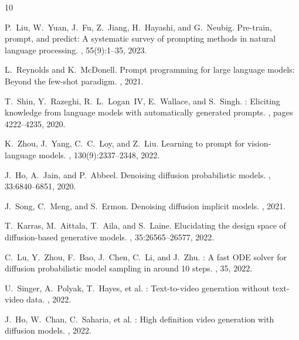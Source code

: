\documentclass[10pt,twocolumn,letterpaper]{article}
\begin{document}
{\begin{thebibliography}{10}

P.~Liu, W.~Yuan, J.~Fu, Z.~Jiang, H.~Hayashi, and G.~Neubig.
\newblock Pre-train, prompt, and predict: A systematic survey of prompting methods in natural language processing.
, 55(9):1--35, 2023.

L.~Reynolds and K.~McDonell.
\newblock Prompt programming for large language models: Beyond the few-shot paradigm.
, 2021.

T.~Shin, Y.~Razeghi, R.~L.~Logan~IV, E.~Wallace, and S.~Singh.
: Eliciting knowledge from language models with automatically generated prompts.
, pages 4222--4235, 2020.

K.~Zhou, J.~Yang, C.~C.~Loy, and Z.~Liu.
\newblock Learning to prompt for vision-language models.
, 130(9):2337--2348, 2022.


J.~Ho, A.~Jain, and P.~Abbeel.
\newblock Denoising diffusion probabilistic models.
, 33:6840--6851, 2020.

J.~Song, C.~Meng, and S.~Ermon.
\newblock Denoising diffusion implicit models.
, 2021.

T.~Karras, M.~Aittala, T.~Aila, and S.~Laine.
\newblock Elucidating the design space of diffusion-based generative models.
, 35:26565--26577, 2022.

C.~Lu, Y.~Zhou, F.~Bao, J.~Chen, C.~Li, and J.~Zhu.
: A fast {ODE} solver for diffusion probabilistic model sampling in around 10 steps.
, 35, 2022.


U.~Singer, A.~Polyak, T.~Hayes, et al.
: Text-to-video generation without text-video data.
, 2022.

J.~Ho, W.~Chan, C.~Saharia, et al.
: High definition video generation with diffusion models.
, 2022.


\end{thebibliography}}
\end{document}
